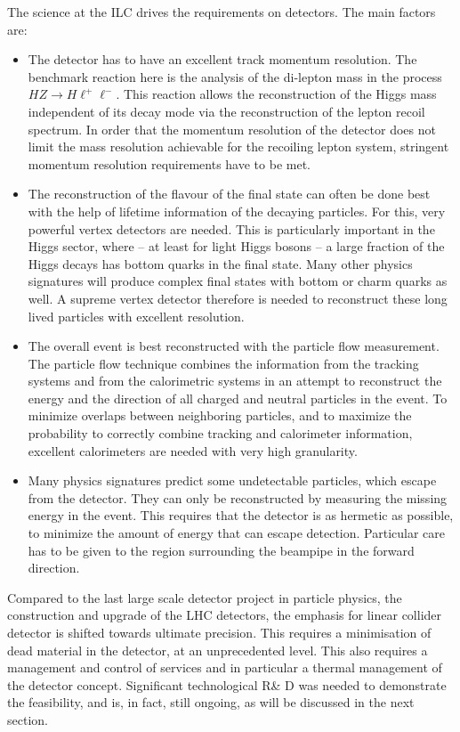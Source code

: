 \documentclass[%
 reprint,
 amsmath,amssymb,
 aps,
]{revtex4-1}
\begin{document}
The science at the ILC drives the requirements on detectors. The main factors are:
\begin{itemize}
 \item The detector has to have an excellent track momentum
   resolution. The benchmark reaction here is the analysis 
of the di-lepton mass in the process $HZ \to H \ell^+
\ell^-$. This reaction allows the reconstruction of the 
Higgs mass independent of its decay mode via the 
reconstruction of the lepton recoil spectrum. In order that 
the momentum resolution of the detector does not limit 
the mass resolution achievable for the recoiling lepton 
system, stringent momentum resolution requirements have to be met. 
\item The reconstruction of the flavour of the final state can 
often be done best with the help of lifetime information of the 
decaying particles. For this, very powerful vertex detectors 
are needed. This is particularly important 
in the Higgs sector, where -- at least for light Higgs bosons -- 
a large fraction of the Higgs decays has bottom 
quarks in the final state. Many other physics signatures will 
produce complex final states with bottom or charm quarks as well. 
A supreme vertex detector therefore is needed to reconstruct these 
long lived particles with excellent resolution. 
\item The overall event is best reconstructed with the 
particle flow measurement. The particle flow technique combines 
the information from the tracking systems and from the 
calorimetric systems in an attempt to reconstruct the 
energy and the direction of all charged and 
neutral particles in the event. To minimize overlaps between 
neighboring particles, and to maximize the probability to 
correctly combine tracking and calorimeter information, 
excellent calorimeters are needed with very high granularity. 
\item Many physics signatures predict some undetectable particles, 
which escape from the detector. They can only be reconstructed by 
measuring the missing energy in the event. This requires 
that the detector is as hermetic as possible, to 
minimize the amount of energy that can escape detection. 
Particular care has to be given to the region surrounding the 
beampipe in the forward direction. 
\end{itemize}

Compared to the last large scale detector project in particle physics, the construction and upgrade of the LHC detectors, the emphasis for linear collider detector is shifted towards ultimate precision. This requires a minimisation of dead material in the detector, at an unprecedented level. This also requires a management and control of services and in particular a thermal management of the detector concept. Significant technological R\& D was needed to demonstrate the feasibility, and is, in fact, still ongoing, as will be discussed in the next section.  
\end{document}
